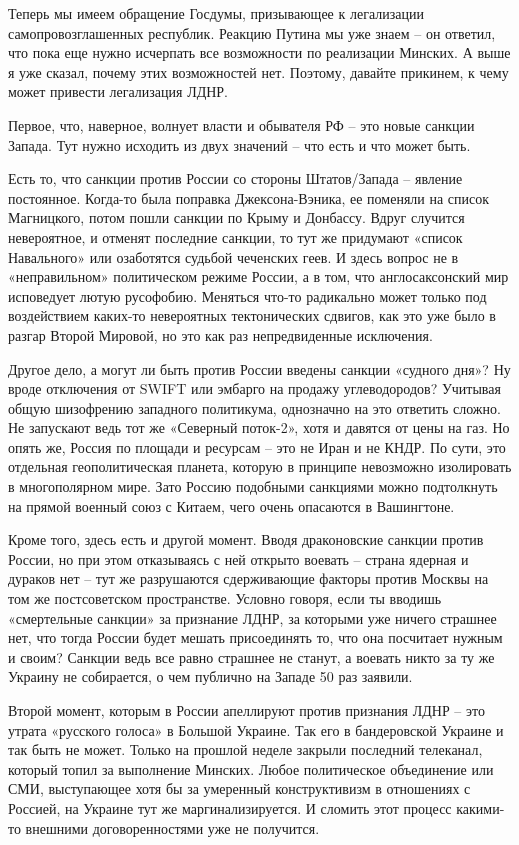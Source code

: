 Теперь мы имеем обращение Госдумы, призывающее к легализации
самопровозглашенных республик. Реакцию Путина мы уже знаем – он ответил, что
пока еще нужно исчерпать все возможности по реализации Минских. А выше я уже
сказал, почему этих возможностей нет. Поэтому, давайте прикинем, к чему может
привести легализация ЛДНР.

Первое, что, наверное, волнует власти и обывателя РФ – это новые санкции
Запада. Тут нужно исходить из двух значений – что есть и что может быть.

Есть то, что санкции против России со стороны Штатов/Запада – явление
постоянное. Когда-то была поправка Джексона-Вэника, ее поменяли на список
Магницкого, потом пошли санкции по Крыму и Донбассу. Вдруг случится
невероятное, и отменят последние санкции, то тут же придумают «список
Навального» или озаботятся судьбой чеченских геев. И здесь вопрос не в
«неправильном» политическом режиме России, а в том, что англосаксонский мир
исповедует лютую русофобию. Меняться что-то радикально может только под
воздействием каких-то невероятных тектонических сдвигов, как это уже было в
разгар Второй Мировой, но это как раз непредвиденные исключения.

Другое дело, а могут ли быть против России введены санкции «судного дня»? Ну
вроде отключения от SWIFT или эмбарго на продажу углеводородов? Учитывая общую
шизофрению западного политикума, однозначно на это ответить сложно. Не
запускают ведь тот же «Северный поток-2», хотя и давятся от цены на газ. Но
опять же, Россия по площади и ресурсам – это не Иран и не КНДР. По сути, это
отдельная геополитическая планета, которую в принципе невозможно изолировать в
многополярном мире. Зато Россию подобными санкциями можно подтолкнуть на прямой
военный союз с Китаем, чего очень опасаются в Вашингтоне.

Кроме того, здесь есть и другой момент. Вводя драконовские санкции против
России, но при этом отказываясь с ней открыто воевать – страна ядерная и
дураков нет – тут же разрушаются сдерживающие факторы против Москвы на том же
постсоветском пространстве. Условно говоря, если ты вводишь «смертельные
санкции» за признание ЛДНР, за которыми уже ничего страшнее нет, что тогда
России будет мешать присоединять то, что она посчитает нужным и своим? Санкции
ведь все равно страшнее не станут, а воевать никто за ту же Украину не
собирается, о чем публично на Западе 50 раз заявили.

Второй момент, которым в России апеллируют против признания ЛДНР – это утрата
«русского голоса» в Большой Украине. Так его в бандеровской Украине и так быть
не может. Только на прошлой неделе закрыли последний телеканал, который топил
за выполнение Минских. Любое политическое объединение или СМИ, выступающее хотя
бы за умеренный конструктивизм в отношениях с Россией, на Украине тут же
маргинализируется. И сломить этот процесс какими-то внешними договоренностями
уже не получится.


